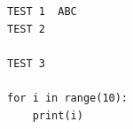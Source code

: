 \documentclass[12pt]{book}
\begin{document}
\begin{Verbatim}
TEST 1  ABC
TEST 2

TEST 3

for i in range(10):
    print(i)
\end{Verbatim}
\end{document}
